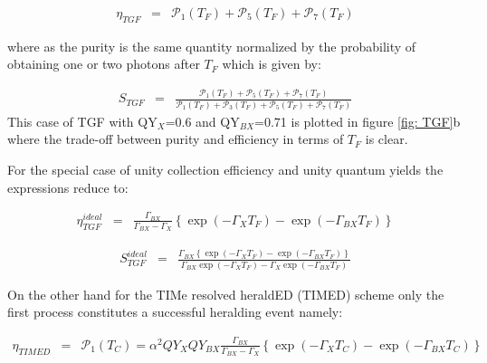 \documentclass[reprint,onecolumn]{revtex4-1}
\begin{document}
\begin{eqnarray*}
\eta_{TGF} & = & \mathscr{\mathcal{\mathscr{P}}}_{1}(T_{F})+\mathscr{\mathcal{\mathscr{P}}}_{5}(T_{F})+\mathscr{\mathcal{\mathscr{P}}}_{7}(T_{F})
\end{eqnarray*}

where as the purity is the same quantity normalized by the probability
of obtaining one or two photons after $T_{F}$ which is given by:

\begin{eqnarray*}
S_{TGF} & = & \frac{\mathscr{\mathcal{\mathscr{P}}}_{1}(T_{F})+\mathscr{\mathcal{\mathscr{P}}}_{5}(T_{F})+\mathscr{\mathcal{\mathscr{P}}}_{7}(T_{F})}{\mathscr{\mathcal{\mathscr{P}}}_{1}(T_{F})+\mathscr{\mathcal{\mathscr{P}}}_{3}(T_{F})+\mathscr{\mathcal{\mathscr{P}}}_{5}(T_{F})+\mathscr{\mathcal{\mathscr{P}}}_{7}(T_{F})}
\label{eq: S_TGF}
\end{eqnarray*}
This case of TGF with QY$_X$=0.6 and QY$_{BX}$=0.71 \cite{Matsuzaki2017StrongAntenna} is plotted in figure \ref{fig: TGF}b where the trade-off between purity and efficiency in terms of $T_F$ is clear. 

For the special case of unity collection efficiency and unity quantum
yields the expressions reduce to:

\begin{eqnarray*}
\eta_{TGF}^{ideal} & = & \frac{\Gamma_{BX}}{\Gamma_{BX}-\Gamma_{X}}\left\{ \exp\left(-\Gamma_{X}T_{F}\right)-\exp\left(-\Gamma_{BX}T_{F}\right)\right\} 
\end{eqnarray*}

\begin{eqnarray*}
S_{TGF}^{ideal} & = & \frac{\Gamma_{BX}\left\{ \exp\left(-\Gamma_{X}T_{F}\right)-\exp\left(-\Gamma_{BX}T_{F}\right)\right\} }{\Gamma_{BX}\exp\left(-\Gamma_{X}T_{F}\right)-\Gamma_{X}\exp\left(-\Gamma_{BX}T_{F}\right)}
\end{eqnarray*}


On the other hand for the TIMe resolved heraldED (TIMED) scheme only
the first process constitutes a successful heralding event namely:

\begin{eqnarray*}
\eta_{TIMED} & = & \mathscr{\mathcal{\mathscr{P}}}_{1}(T_{C})=\alpha^{2}QY_{X}QY_{BX}\frac{\Gamma_{BX}}{\Gamma_{BX}-\Gamma_{X}}\left\{ \exp\left(-\Gamma_{X}T_{C}\right)-\exp\left(-\Gamma_{BX}T_{C}\right)\right\} 
\end{eqnarray*}
\end{document}
